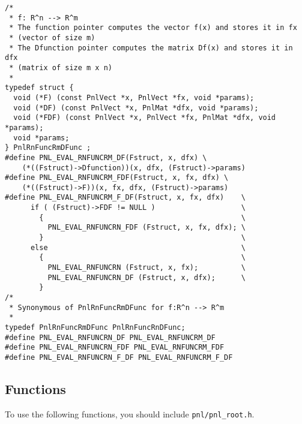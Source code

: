 \begin{lstlisting}
/*
 * f: R^n --> R^m
 * The function pointer computes the vector f(x) and stores it in fx
 * (vector of size m)
 * The Dfunction pointer computes the matrix Df(x) and stores it in dfx
 * (matrix of size m x n)
 *
typedef struct {
  void (*F) (const PnlVect *x, PnlVect *fx, void *params);
  void (*DF) (const PnlVect *x, PnlMat *dfx, void *params);
  void (*FDF) (const PnlVect *x, PnlVect *fx, PnlMat *dfx, void *params);
  void *params;
} PnlRnFuncRmDFunc ;
#define PNL_EVAL_RNFUNCRM_DF(Fstruct, x, dfx) \
    (*((Fstruct)->Dfunction))(x, dfx, (Fstruct)->params)
#define PNL_EVAL_RNFUNCRM_FDF(Fstruct, x, fx, dfx) \
    (*((Fstruct)->F))(x, fx, dfx, (Fstruct)->params)
#define PNL_EVAL_RNFUNCRM_F_DF(Fstruct, x, fx, dfx)    \
      if ( (Fstruct)->FDF != NULL )                    \
        {                                              \
          PNL_EVAL_RNFUNCRN_FDF (Fstruct, x, fx, dfx); \
        }                                              \
      else                                             \
        {                                              \
          PNL_EVAL_RNFUNCRN (Fstruct, x, fx);          \
          PNL_EVAL_RNFUNCRN_DF (Fstruct, x, dfx);      \
        }
/*
 * Synonymous of PnlRnFuncRmDFunc for f:R^n --> R^m
 *
typedef PnlRnFuncRmDFunc PnlRnFuncRnDFunc;
#define PNL_EVAL_RNFUNCRN_DF PNL_EVAL_RNFUNCRM_DF
#define PNL_EVAL_RNFUNCRN_FDF PNL_EVAL_RNFUNCRM_FDF
#define PNL_EVAL_RNFUNCRN_F_DF PNL_EVAL_RNFUNCRM_F_DF
\end{lstlisting}

\subsection{Functions}

To use the following functions, you should include \verb!pnl/pnl_root.h!.

